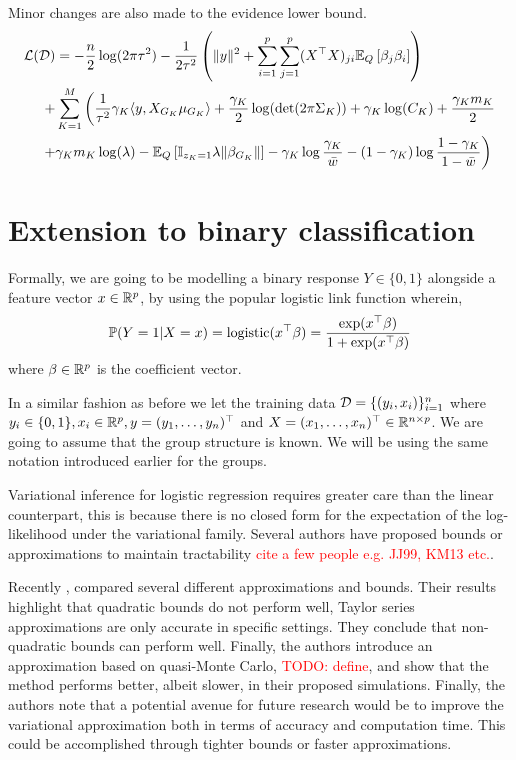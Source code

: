 \documentclass[12pt]{article}
\renewcommand{\red}[1]{\textcolor{red}{#1}}
\begin{document}
Minor changes are also made to the evidence lower bound.
\begin{equation} \label{eq:QD_elbo} 
\begin{aligned}
    \mathcal{L}(\mathcal{D}) &= 
- 
    \frac{n}{2} \log(2 \pi \tau^2) 
- 
    \frac{1}{2\tau^2} \left( \| y \|^2  + \sum_{i=1}^p \sum_{j=1}^p (X^\top X)_{ji} \mathbb{E}_Q \left[ \beta_j \beta_i \right] \right)\\
+& 
    \sum_{K=1}^M \bigg(  
\frac{1}{\tau^2} \gamma_K \langle y, X_{G_K} \mu_{G_K} \rangle
+
    \frac{\gamma_K}{2} \log( \det (2 \pi \Sigma_K))
+
    \gamma_K \log(C_K)
+ 
    \frac{\gamma_K m_K}{2} \\
+ &
    \gamma_K m_K \log (\lambda)
-
    \mathbb{E}_Q \left[ \mathbb{I}_{z_K =1} \lambda \| \beta_{G_K} \| \right]
-
    \gamma_K \log \frac{\gamma_K}{\bar{w}}
-
    (1-\gamma_K) \log \frac{1 - \gamma_K}{1 - \bar{w}}
\bigg)
\end{aligned}
\end{equation}


\newpage
\section{Extension to binary classification}

Formally, we are going to be modelling a binary response $Y \in \{0, 1 \}$ alongside a feature vector $x \in \mathbb{R}^p$, by using the popular logistic link function wherein,
\begin{equation}
    \mathbb{P}(Y = 1 | X = x) = \text{logistic}(x^\top \beta) =  \frac{\exp(x^\top \beta)}{1 + \exp(x^\top \beta)}
\end{equation}
where $\beta \in \mathbb{R}^p$ is the coefficient vector.

In a similar fashion as before we let the training data $\mathcal{D} = \{(y_i, x_i)\}_{i=1}^n$ where $y_i \in \{0, 1\}, x_i \in \mathbb{R}^p, y=(y_1, \dots, y_n)^\top$ and $X=(x_1, \dots, x_n)^\top \in \mathbb{R}^{n \times p}$. We are going to assume that the group structure is known. We will be using the same notation introduced earlier for the groups. 

Variational inference for logistic regression requires greater care than the linear counterpart, this is because there is no closed form for the expectation of the log-likelihood under the variational family. Several authors have proposed bounds or approximations to maintain tractability \red{cite a few people e.g. JJ99, KM13 etc.}.

Recently \cite{Depraetere2017a}, compared several different approximations and bounds. Their results highlight that quadratic bounds do not perform well, Taylor series approximations are only accurate in specific settings. They conclude that non-quadratic bounds can perform well. Finally, the authors introduce an approximation based on quasi-Monte Carlo, \red{TODO: define}, and show that the method performs better, albeit slower, in their proposed simulations. Finally, the authors note that a potential avenue for future research would be to improve the variational approximation both in terms of accuracy and computation time. This could be accomplished through tighter bounds or faster approximations. 
\end{document}
